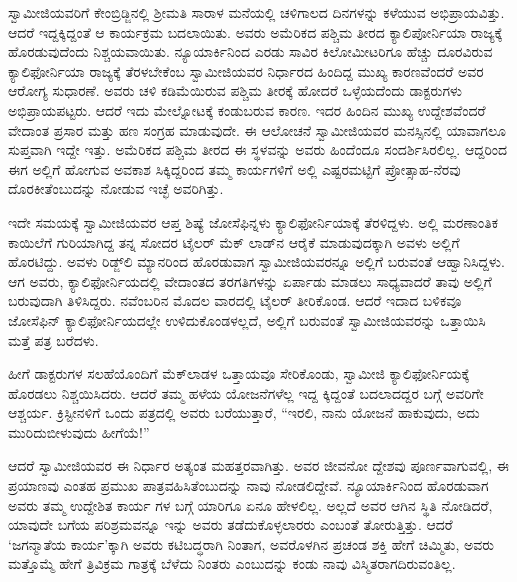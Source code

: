 ಸ್ವಾಮೀಜಿಯವರಿಗೆ ಕೇಂಬ್ರಿಡ್ಜಿನಲ್ಲಿ ಶ್ರೀಮತಿ ಸಾರಾಳ ಮನೆಯಲ್ಲಿ ಚಳಿಗಾಲದ ದಿನಗಳನ್ನು ಕಳೆಯುವ ಅಭಿಪ್ರಾಯವಿತ್ತು. ಆದರೆ ಇದ್ದಕ್ಕಿದ್ದಂತೆ ಆ ಕಾರ್ಯಕ್ರಮ ಬದಲಾಯಿತು. ಅವರು ಅಮೆರಿಕದ ಪಶ್ಚಿಮ ತೀರದ ಕ್ಯಾಲಿಪೋರ್ನಿಯಾ ರಾಜ್ಯಕ್ಕೆ ಹೊರಡುವುದೆಂದು ನಿಶ್ಚಯವಾಯಿತು. ನ್ಯೂಯಾರ್ಕಿನಿಂದ ಎರಡು ಸಾವಿರ ಕಿಲೋಮೀಟರಿಗೂ ಹೆಚ್ಚು ದೂರವಿರುವ ಕ್ಯಾಲಿಫೋರ್ನಿಯಾ ರಾಜ್ಯಕ್ಕೆ ತೆರಳಬೇಕೆಂಬ ಸ್ವಾಮೀಜಿಯವರ ನಿರ್ಧಾರದ ಹಿಂದಿದ್ದ ಮುಖ್ಯ ಕಾರಣವೆಂದರೆ ಅವರ ಆರೋಗ್ಯ ಸುಧಾರಣೆ. ಅವರು ಚಳಿ ಕಡಿಮೆಯಿರುವ ಪಶ್ಚಿಮ ತೀರಕ್ಕೆ ಹೋದರೆ ಒಳ್ಳೆಯದೆಂದು ಡಾಕ್ಟರುಗಳು ಅಭಿಪ್ರಾಯಪಟ್ಟರು. ಆದರೆ ಇದು ಮೇಲ್ನೋಟಕ್ಕೆ ಕಂಡುಬರುವ ಕಾರಣ. ಇದರ ಹಿಂದಿನ ಮುಖ್ಯ ಉದ್ದೇಶವೆಂದರೆ ವೇದಾಂತ ಪ್ರಸಾರ ಮತ್ತು ಹಣ ಸಂಗ್ರಹ ಮಾಡುವುದೇ. ಈ ಆಲೋಚನೆ ಸ್ವಾಮೀಜಿಯವರ ಮನಸ್ಸಿನಲ್ಲಿ ಯಾವಾಗಲೂ ಸುಪ್ತವಾಗಿ ಇದ್ದೇ ಇತ್ತು. ಅಮೆರಿಕದ ಪಶ್ಚಿಮ ತೀರದ ಈ ಸ್ಥಳವನ್ನು ಅವರು ಹಿಂದೆಂದೂ ಸಂದರ್ಶಿಸಿರಲಿಲ್ಲ. ಆದ್ದರಿಂದ ಈಗ ಅಲ್ಲಿಗೆ ಹೋಗುವ ಅವಕಾಶ ಸಿಕ್ಕಿದ್ದರಿಂದ ತಮ್ಮ ಕಾರ್ಯಗಳಿಗೆ ಅಲ್ಲಿ ಎಷ್ಟರಮಟ್ಟಿಗೆ ಪ್ರೋತ್ಸಾಹ-ನೆರವು ದೊರಕೀತೆಂಬುದನ್ನು ನೋಡುವ ಇಚ್ಛೆ ಅವರಿಗಿತ್ತು.

ಇದೇ ಸಮಯಕ್ಕೆ ಸ್ವಾಮೀಜಿಯವರ ಆಪ್ತ ಶಿಷ್ಯೆ ಜೋಸೆಫಿನ್ನಳು ಕ್ಯಾಲಿಫೋರ್ನಿಯಾಕ್ಕೆ ತೆರಳಿದ್ದಳು. ಅಲ್ಲಿ ಮರಣಾಂತಿಕ ಕಾಯಿಲೆಗೆ ಗುರಿಯಾಗಿದ್ದ ತನ್ನ ಸೋದರ ಟೈಲರ್ ಮೆಕ್ ಲಾಡ್​ನ ಆರೈಕೆ ಮಾಡುವುದಕ್ಕಾಗಿ ಅವಳು ಅಲ್ಲಿಗೆ ಹೊರಟಿದ್ದು. ಅವಳು ರಿಡ್ಜ್​ಲಿ ಮ್ಯಾನರಿಂದ ಹೊರಡುವಾಗ ಸ್ವಾಮೀಜಿಯವರನ್ನೂ ಅಲ್ಲಿಗೆ ಬರುವಂತೆ ಆಹ್ವಾನಿಸಿದ್ದಳು. ಆಗ ಅವರು, ಕ್ಯಾಲಿಫೋರ್ನಿಯದಲ್ಲಿ ವೇದಾಂತದ ತರಗತಿಗಳನ್ನು ಏರ್ಪಾಡು ಮಾಡಲು ಸಾಧ್ಯವಾದರೆ ತಾವು ಅಲ್ಲಿಗೆ ಬರುವುದಾಗಿ ತಿಳಿಸಿದ್ದರು. ನವೆಂಬರಿನ ಮೊದಲ ವಾರದಲ್ಲಿ ಟೈಲರ್ ತೀರಿಕೊಂಡ. ಆದರೆ ಇದಾದ ಬಳಿಕವೂ ಜೋಸೆಫಿನ್ ಕ್ಯಾಲಿಫೋರ್ನಿಯದಲ್ಲೇ ಉಳಿದುಕೊಂಡಳಲ್ಲದೆ, ಅಲ್ಲಿಗೆ ಬರುವಂತೆ ಸ್ವಾಮೀಜಿಯವರನ್ನು ಒತ್ತಾಯಿಸಿ ಮತ್ತೆ ಪತ್ರ ಬರೆದಳು.

ಹೀಗೆ ಡಾಕ್ಟರುಗಳ ಸಲಹೆಯೊಂದಿಗೆ ಮೆಕ್​ಲಾಡಳ ಒತ್ತಾಯವೂ ಸೇರಿಕೊಂಡು, ಸ್ವಾಮೀಜಿ ಕ್ಯಾಲಿಫೋರ್ನಿಯಕ್ಕೆ ಹೊರಡಲು ನಿಶ್ಚಯಿಸಿದರು. ಆದರೆ ತಮ್ಮ ಹಳೆಯ ಯೋಜನೆಗಳೆಲ್ಲ ಇದ್ದ ಕ್ಕಿದ್ದಂತೆ ಬದಲಾದದ್ದರ ಬಗ್ಗೆ ಅವರಿಗೇ ಆಶ್ಚರ್ಯ. ಕ್ರಿಸ್ಟೀನಳಿಗೆ ಒಂದು ಪತ್ರದಲ್ಲಿ ಅವರು ಬರೆಯುತ್ತಾರೆ, “ಇರಲಿ, ನಾನು ಯೋಜನೆ ಹಾಕುವುದು, ಅದು ಮುರಿದುಬೀಳುವುದು ಹೀಗೆಯೆ!”

ಆದರೆ ಸ್ವಾಮೀಜಿಯವರ ಈ ನಿರ್ಧಾರ ಅತ್ಯಂತ ಮಹತ್ತರವಾಗಿತ್ತು. ಅವರ ಜೀವನೋ ದ್ದೇಶವು ಪೂರ್ಣವಾಗುವಲ್ಲಿ, ಈ ಪ್ರಯಾಣವು ಎಂತಹ ಪ್ರಮುಖ ಪಾತ್ರವಹಿಸಿತೆಂಬುದನ್ನು ನಾವು ನೋಡಲಿದ್ದೇವೆ. ನ್ಯೂಯಾರ್ಕಿನಿಂದ ಹೊರಡುವಾಗ ಅವರು ತಮ್ಮ ಉದ್ದೇಶಿತ ಕಾರ್ಯ ಗಳ ಬಗ್ಗೆ ಯಾರಿಗೂ ಏನೂ ಹೇಳಲಿಲ್ಲ. ಅಲ್ಲದೆ ಅವರ ಆಗಿನ ಸ್ಥಿತಿ ನೋಡಿದರೆ, ಯಾವುದೇ ಬಗೆಯ ಪರಿಶ್ರಮವನ್ನೂ ಇನ್ನು ಅವರು ತಡೆದುಕೊಳ್ಳಲಾರರು ಎಂಬಂತೆ ತೋರುತ್ತಿತ್ತು. ಆದರೆ ‘ಜಗನ್ಮಾತೆಯ ಕಾರ್ಯ’ಕ್ಕಾಗಿ ಅವರು ಕಟಿಬದ್ಧರಾಗಿ ನಿಂತಾಗ, ಅವರೊಳಗಿನ ಪ್ರಚಂಡ ಶಕ್ತಿ ಹೇಗೆ ಚಿಮ್ಮಿತು, ಅವರು ಮತ್ತೊಮ್ಮೆ ಹೇಗೆ ತ್ರಿವಿಕ್ರಮ ಗಾತ್ರಕ್ಕೆ ಬೆಳೆದು ನಿಂತರು ಎಂಬುದನ್ನು ಕಂಡು ನಾವು ವಿಸ್ಮಿತರಾಗದಿರುವಂತಿಲ್ಲ.

